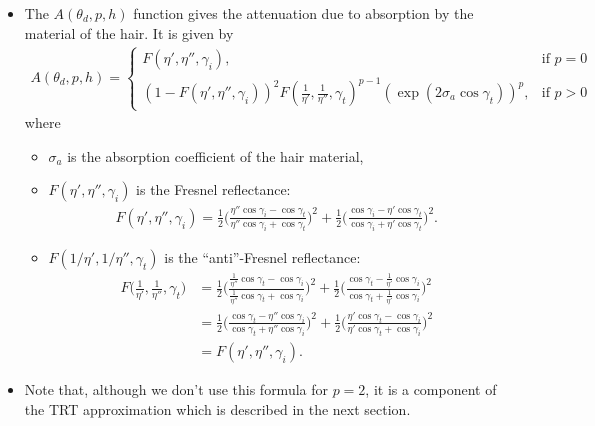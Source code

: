 \documentclass[10pt]{article}
\begin{document}
\begin{itemize}
    \item The $A(\theta_d, p, h)$ function gives the attenuation
      due to absorption by the material of the hair. It is given
      by
      \begin{align*}
        A(\theta_d, p, h) = \begin{cases}
          F(\eta', \eta'', \gamma_i), & \mbox{if }p = 0\\
          (1-F(\eta', \eta'', \gamma_i))^2 F( \frac{1}{\eta'}, \frac{1}{\eta''}, \gamma_t )^{p-1} ( \exp(2\sigma_a \cos \gamma_t ))^p, 
          & \mbox{if }p > 0
        \end{cases}
      \end{align*}
      where
      \begin{itemize}
        \item $\sigma_a$ is the absorption coefficient of
          the hair material,
        \item $F(\eta', \eta'', \gamma_i)$ is the Fresnel 
          reflectance:
          \begin{align*}
            F(\eta', \eta'', \gamma_i) = 
            \frac{1}{2} \bigg( \frac{\eta'' \cos \gamma_i - \cos \gamma_t}{\eta'' \cos \gamma_i + \cos \gamma_t} \bigg)^2
            + \frac{1}{2} \bigg( \frac{\cos \gamma_i - \eta' \cos \gamma_t}{\cos \gamma_i + \eta' \cos \gamma_t}  \bigg)^2.
          \end{align*}          
        \item $F(1/\eta', 1/\eta'', \gamma_t)$ is the ``anti''-Fresnel reflectance:
          \begin{align*}
            F\bigg( \frac{1}{\eta'}, \frac{1}{\eta''}, 
            \gamma_t \bigg) 
            &= 
            \frac{1}{2} \bigg( \frac{ \frac{1}{\eta''} \cos \gamma_t - \cos \gamma_i}{\frac{1}{\eta''} \cos \gamma_t + \cos \gamma_i} \bigg)^2
            + \frac{1}{2} \bigg( \frac{\cos \gamma_t - \frac{1}{\eta'} \cos \gamma_i}{\cos \gamma_t + \frac{1}{\eta'} \cos \gamma_i}  \bigg)^2\\
            &= 
            \frac{1}{2} \bigg( \frac{ \cos \gamma_t - \eta'' \cos \gamma_i}{ \cos \gamma_t + \eta'' \cos \gamma_i} \bigg)^2
            + \frac{1}{2} \bigg( \frac{\eta' \cos \gamma_t - \cos \gamma_i}{\eta' \cos \gamma_t + \cos \gamma_i}  \bigg)^2\\
            &= F(\eta', \eta'', \gamma_i).
          \end{align*}
      \end{itemize}
            
    \item Note that, although we don't use this formula for $p = 2$,
      it is a component of the TRT approximation which is described
      in the next section.
      
  \end{itemize}
  
\end{document}
